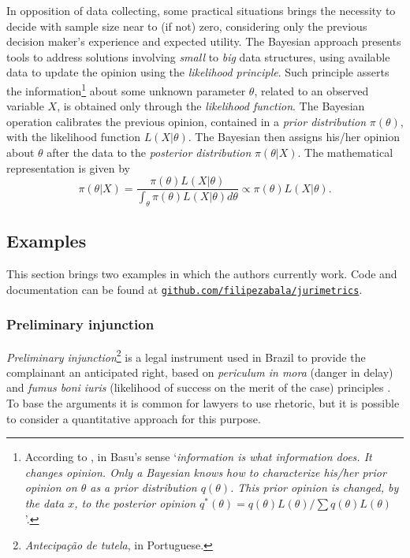\documentclass[a4paper]{exam}
\theoremstyle{plain}
\begin{document}
In opposition of data collecting, some practical situations brings the necessity to decide with sample size near to (if not) zero, considering only the previous decision maker's experience and expected utility. The Bayesian approach presents tools to address solutions involving \textit{small} to \textit{big} data structures, using available data to update the opinion using the \textit{likelihood principle}. Such principle asserts the information\footnote{ According to \cite{gosh1988statistical}, in Basu's sense `\textit{information is what information does. It changes opinion. Only a Bayesian knows how to characterize his/her prior opinion on $\theta$ as a prior distribution $q(\theta)$. This prior opinion is changed, by the data $x$, to the posterior opinion $q^{*}(\theta)= q(\theta)L(\theta)/\sum q(\theta)L(\theta)$}'.} about some unknown parameter $\theta$, related to an observed variable $X$, is obtained only through the \textit{likelihood function}. The Bayesian operation calibrates the previous opinion, contained in a \textit{prior distribution} $\pi(\theta)$, with the likelihood function $L(X|\theta)$. The Bayesian then assigns his/her opinion about $\theta$ after the data to the \textit{posterior distribution} $\pi(\theta|X)$. The mathematical representation is given by \[ \pi(\theta|X) = \frac{\pi(\theta) L(X|\theta)}{\int_{\theta} \pi(\theta) L(X|\theta) d\theta} \propto \pi(\theta) L(X|\theta). \] 

\subsection{Examples}\label{sec:ex}
This section brings two examples in which the authors currently work. Code and documentation can be found at \href{https://www.github.com/filipezabala/jurimetrics}{\nolinkurl{github.com/filipezabala/jurimetrics}}.


\subsubsection{Preliminary injunction}\label{exe:pi}

\textit{Preliminary injunction}\footnote{ \textit{Antecipação de tutela}, in Portuguese.} is a legal instrument used in Brazil to provide the complainant an anticipated right, based on \textit{periculum in mora} (danger in delay) and \textit{fumus boni iuris} (likelihood of success on the merit of the case) principles \cite{grubbs2003international}. To base the arguments it is common for lawyers to use rhetoric, but it is possible to consider a quantitative approach for this purpose.
\end{document}
